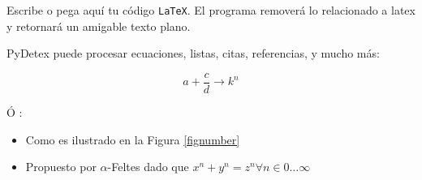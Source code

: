 Escribe o pega aquí tu código \texttt{LaTeX}. El programa removerá lo relacionado a latex y retornará un amigable texto plano. %

PyDetex puede procesar ecuaciones, listas, citas, referencias, y mucho más:

\begin{equation}
   a + \frac{c}{d} \longrightarrow k^n
\end{equation}

Ó :

\begin{itemize}[font=\bfseries]
   \item Como es ilustrado en la Figura \ref{fignumber}
   \item Propuesto por $\alpha$-Feltes \cite{feltes2008} dado que $x^n + y^n = z^n \forall n \in 0 \ldots \infty$
\end{itemize}